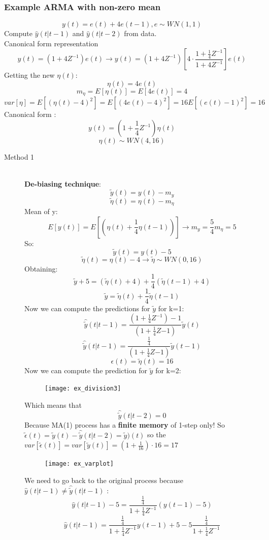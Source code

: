 \subsubsection{Example ARMA with non-zero mean}
$$ y(t) =e(t) + 4e(t-1) , e \sim WN(1,1)$$
Compute $\hat{y}(t|t-1)$ and $\hat{y}(t|t-2)$ from data.\\
Canonical form representation\\
$$y(t) =(1+4Z^{-1})e(t) \to y(t)= (1+4Z^{-1})[4\cdot \frac{1+\frac{1}{4}Z^{-1}}{1+4Z^{-1}}]e(t)$$
Getting the new $\eta(t)$:
$$ \eta(t) = 4e(t)$$
$$m_{\eta}=E[\eta(t)]=E[4e(t)] = 4$$
$$var[\eta]= E[(\eta(t)-4)^2]= E[(4e(t)-4)^2]= 16E[(e(t)-1)^2] =16$$
Canonical form :
\[
\boxed{y(t) =(1+\frac{1}{4}Z^{-1})\eta(t)}
\]
\[
\boxed{\eta(t) \sim WN(4,16)}
\]
\begin{description}
\item[Method 1]\hfill\\
\textbf{De-biasing technique}:
$$ \tilde{y}(t) = y(t) - m_y$$
$$ \tilde{\eta}(t) = \eta(t) - m_{\eta}$$
Mean of y:
$$ E[y(t)]=E[(\eta(t)+\frac{1}{4}\eta(t-1))] \to m_y= \frac{5}{4}m_{\eta}=5$$
So:
$$ \tilde{y}(t) = y(t) - 5$$
$$ \tilde{\eta}(t) = \eta(t) - 4 \to \tilde{\eta} \sim WN(0,16)$$
Obtaining:
$$ \tilde{y}+5= (\tilde{\eta}(t)+4)+\frac{1}{4}(\tilde{\eta}(t-1)+4)$$
\[
\boxed{\tilde{y}= \tilde{\eta}(t)+\frac{1}{4}\tilde{\eta}(t-1)}
\]
Now we can compute the predictions for $\tilde{y}$ for k=1:
 $$ \hat{\tilde{y}}(t|t-1)= \frac{(1+\frac{1}{4}Z^{-1})-1}{(1+\frac{1}{4}Z{-1})} \tilde{y}(t)$$
\[
\boxed{\hat{\tilde{y}}(t|t-1)= \frac{\frac{1}{4}}{(1+\frac{1}{4}Z{-1})} \tilde{y}(t-1)}
\]
\[
\boxed{\epsilon(t) = \tilde{\eta}(t) = 16}
\]
Now we can compute the prediction for $\tilde{y}$ for k=2:
\begin{figure}[H]
 \centering
  \texttt{[image: ex\_division3]}
\end{figure}
Which means that 
\[
\boxed{\hat{\tilde{y}}(t|t-2) = 0}
\]
Because MA(1) process has a \textbf{finite memory} of 1-step only!
So $\tilde{\epsilon}(t) = \tilde{y}(t) - \hat{\tilde{y}}(t|t-2) = \tilde{y})(t)$ so the $var[\tilde{\epsilon}(t)]=var[\tilde{y}(t)] = (1+\frac{1}{16}) \cdot 16= 17$
\begin{figure}[H]
 \centering
  \texttt{[image: ex\_varplot]}
\end{figure}
We need to go back to the original process because $\hat{y}(t|t-1) \neq \hat{\tilde{y}}(t|t-1)$ : 
$$ \hat{y}(t|t-1)-5 = \frac{\frac{1}{4}}{1+\frac{1}{4}Z^{-1}}(y(t-1)-5)$$
$$ \hat{y}(t|t-1)= \frac{\frac{1}{4}}{1+\frac{1}{4}Z^{-1}}y(t-1)+5 - 5\frac{\frac{1}{4}}{1+\frac{1}{4}Z^{-1}}$$


\end{description}